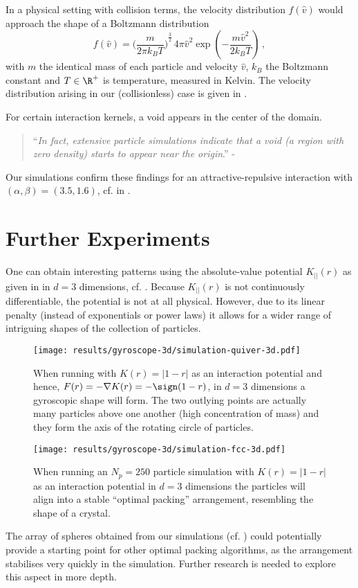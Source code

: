 In a physical setting with collision terms, the velocity distribution $f(\hat{v})$ would approach the shape of a Boltzmann distribution
$$f(\hat{v})={\bigg(\frac{m}{2\pi k_B T}\bigg)}^{\frac {3}{2}}\,4\pi \hat{v}^{2}\exp \left(-{\frac {m \hat{v}^{2}}{2k_B T}}\right)\,,$$
with $m$ the identical mass of each particle and velocity $\hat{v}$, $k_B$ the Boltzmann constant and $T \in \R^+$ is temperature, measured in Kelvin.
The velocity distribution arising in our (collisionless) case is given in .

For certain interaction kernels, a void appears in the center of the domain.
\begin{quote}
  ``\textit{In fact, extensive particle simulations indicate that a void (a region with zero density) starts to appear near the origin}.''
  - \cite{2013-void,2017-explicit-solutions}
\end{quote}
Our simulations confirm these findings for an attractive-repulsive interaction with $(\alpha,\beta) = (3.5, 1.6)$, cf.  in .

\pagebreak

\section{Further Experiments}
One can obtain interesting patterns using the absolute-value potential $K_{||}(r)$ as given in  in $d=3$ dimensions, cf. .
Because $K_{||}(r)$ is not continuously differentiable, the potential is not at all physical.
However, due to its linear penalty (instead of exponentials or power laws) it allows for a wider range of intriguing shapes of the collection of particles.

\begin{figure}[H]
  \centering
  \texttt{[image: results/gyroscope-3d/simulation-quiver-3d.pdf]}
  \caption[Absolute Value Potential 3-dimensional gyroscope visualisation]{When running with $K(r) = |1-r|$ as an interaction potential and hence, $F(r) = -\nabla K(r) = -\sign(1-r)$, in $d=3$ dimensions a gyroscopic shape will form. The two outlying points are actually many particles above one another (high concentration of mass) and they form the axis of the rotating circle of particles.}
  \label{fig:gyroscope-quiver-3d}
\end{figure}

\begin{figure}[H]
  \centering
  \texttt{[image: results/gyroscope-3d/simulation-fcc-3d.pdf]}
  \caption[Absolute Value Potential 3-dimensional sphere packing visualisation]{When running an $N_p = 250$ particle simulation with $K(r) = |1-r|$ as an interaction potential in $d=3$ dimensions the particles will align into a stable ``optimal packing'' arrangement, resembling the shape of a crystal.}
  \label{fig:fcc-quiver-3d}
\end{figure}

The array of spheres obtained from our simulations (cf. ) could potentially provide a starting point for other optimal packing algorithms, as the arrangement stabilises very quickly in the simulation.
Further research is needed to explore this aspect in more depth.
